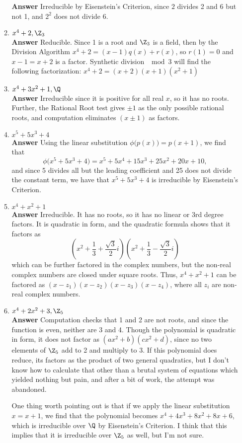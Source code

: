 \documentclass[letterpaper]{article}
\begin{document}
\begin{enumerate}
\begin{enumerate}[label=(\roman*)]
				\textbf{Answer} Irreducible by Eisenstein's Criterion, since $2$ divides 2 and 6 but not 1, and $2^2$ does not divide 6. 
			\item $x^4+2, \Z_3$ \\
				\textbf{Answer} Reducible. Since 1 is a root and $\Z_3$ is a field, then by the Division Algorithm $x^{4}+2=(x-1)q(x)+r(x)$, so $r(1)=0$ and $x-1=x+2$ is a factor. Synthetic division $\mod 3$ will find the following factorization: $x^{4}+2=(x+2)(x+1)(x^2+1)$
			\item $x^{4}+3x^{2}+1, \Q$ \\ 
				\textbf{Answer} Irreducible since it is positive for all real $x$, so it has no roots. Further, the Rational Root test gives $\pm 1$ as the only possible rational roots, and computation eliminates $(x\pm1)$ as factors.
			\item $x^{5}+5x^{3}+4$ \\ 
			 \textbf{Answer} Using the linear substitution $\phi\big(p(x)\big)=p(x+1)$, we find that $$\phi\big(x^{5}+5x^{3}+4\big)=x^{5}+5x^{4}+15x^{3}+25x^{2}+20x+10,$$
			 and since 5 divides all but the leading coefficient and 25 does not divide the constant term, we have that $x^{5}+5x^{3}+4$ is irreducible by Eisenstein's Criterion. 
			\item $x^{4}+x^{2}+1$ \\
				\textbf{Answer} Irreducible. It has no roots, so it has no linear or 3rd degree factors. It is quadratic in form, and the quadratic formula shows that it factors as $$\left (x^2+\frac{1}{3}+\frac{\sqrt{3}}{2}i\right )\left (x^2+\frac{1}{3}-\frac{\sqrt{3}}{2}i\right )$$ which can be further factored in the complex numbers, but the non-real complex numbers are closed under square roots. Thus, $x^{4}+x^{2}+1$ can be factored as $(x-z_1)(x-z_2)(x-z_3)(x-z_4)$, where all $z_i$ are non-real complex numbers. 
			\item $x^{4}+2x^2+3, \Z_5$ \\
				\textbf{Answer} Computation checks that 1 and 2 are not roots, and since the function is even, neither are 3 and 4. Though the polynomial is quadratic in form, it does not factor as $(ax^2+b)(cx^2+d)$, since no two elements of $\Z_5$ add to 2 and multiply to 3. If this polynomial does reduce, its factors as the product of two general quadratics, but I don't know how to calculate that other than a brutal system of equations which yielded nothing but pain, and after a bit of work, the attempt was abandoned. 
				
				One thing worth pointing out is that if we apply the linear substitution $x=x+1$, we find that the polynomial becomes $x^{4}+4x^3+8x^2+8x+6$, which is irreducible over $\Q$ by Eisenstein's Criterion. I think that this implies that it is irreducible over $\Z_5$ as well, but I'm not sure. 
 		\end{enumerate}
\end{enumerate}
\end{document}
